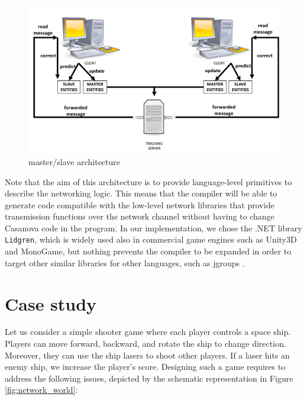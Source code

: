\begin{figure}
	\centering
	\includegraphics[width = \textwidth]{Figures/masterslave}
	\caption{master/slave architecture}
	\label{fig:masterslave}
\end{figure}

Note that the aim of this architecture is to provide language-level primitives to describe the networking logic. This means that the compiler will be able to generate code compatible with the low-level network libraries that provide transmission functions over the network channel without having to change Casanova code in the program. In our implementation, we chose the .NET library \texttt{Lidgren}, which is widely used also in commercial game engines such as Unity3D and MonoGame, but nothing prevents the compiler to be expanded in order to target other similar libraries for other languages, such as jgroups \cite{ban2002jgroups}.

\section{Case study}
Let us consider a simple shooter game where each player controls a space ship. Players can move forward, backward, and rotate the ship to change direction. Moreover, they can use the ship lasers to shoot other players. If a laser hits an enemy ship, we increase the player's score. Designing such a game requires to address the following issues, depicted by the schematic representation in Figure \ref{fig:network_world}:

